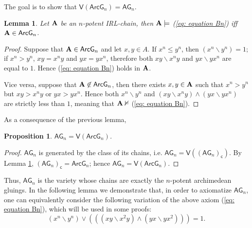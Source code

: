 \documentclass{amsart}
\newtheorem{lemma}[theorem]{Lemma}
\newtheorem{proposition}[theorem]{Proposition}
\theoremstyle{definition}
\numberwithin{equation}{section}
\newcommand{\join}{\vee}
\newcommand{\meet}{\wedge}
\newcommand{\alg}[1]{{\textbf{\upshape #1}}}  %
\newcommand{\vv}[1]{\mathsf {#1}}
\newcommand{\BlockG}{\vv{ArcG}}
\newcommand{\BG}{\vv{AG}}
\begin{document}
 The goal is to show that $\vv V(\BlockG_{n})=\BG_{n}$. 
 \begin{lemma}\label{lemma: equation holding in Bn}
 	Let $\alg A$ be an $n$-potent IRL-chain, then $\alg A \models$ {\rm (\ref{eq: equation Bn})} iff $\alg A \in \BlockG_{n}$. 
 \end{lemma}
 \begin{proof}
 	Suppose that $\alg A \in \BlockG_{n}$ and let $x,y \in A$. If $x^n\leq y^n$, then $(x^n \backslash y^n)=1$; if $x^n > y^n$,  $xy=x^ny$ and $yx=yx^n$, therefore both $xy \backslash x^ny $ and $yx \backslash yx^n$ are equal to $1$. Hence (\ref{eq: equation Bn}) holds in $\alg A$. 
 	
 	 	Vice versa, suppose that $\alg A \not \in \BlockG_{n}$, then there exists $x,y \in \alg A$ such that $x^n > y^n$ but $xy > x^ny$ or $yx > yx^n$. Hence both $x^n \backslash y^n$ and $(xy \backslash x^ny)\meet (yx \backslash yx^n)$ are strictly less than $1$, meaning that $\alg A \nvDash$ (\ref{eq: equation Bn}).	
 \end{proof}
 As a consequence of the previous lemma, 
 \begin{proposition}
 	$\BG_{n}=\vv V(\BlockG_n)$.
 \end{proposition}
 \begin{proof}
 	$\BG_{n}$ is generated by the class of its chains, i.e. $\BG_{n}=\vv V((\BG_{n})_{\vv c})$. By Lemma \ref{lemma: equation holding in Bn}, $(\BG_{n})_{\vv c}=\BlockG_{n}$; hence $\BG_{n}=\vv V(\BlockG_{n})$.
 \end{proof}
 Thus, $\BG_n$ is the variety whose chains are exactly the $n$-potent archimedean gluings. In the following lemma we demonstrate that, in order to axiomatize $\BG_n$, one can equivalently consider the following variation of the above axiom {\rm (\ref{eq: equation Bn})}, which will be used in some proofs:
 \begin{equation*} \label{eq: equation 2Bn}
  	(x^n \backslash y^n) \join (((xy\backslash x^2y)\meet (yx \backslash yx^2)))=1
  	\tag{block$_n^2$}. 
  	 \end{equation*} 
\end{document}
